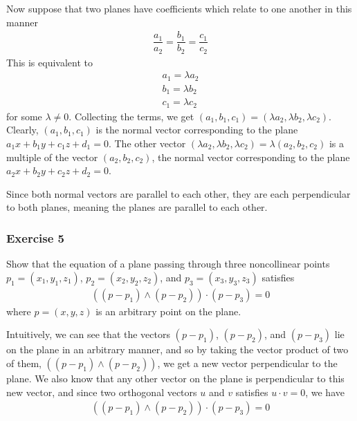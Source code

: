 \documentclass{article}
\begin{document}
	Now suppose that two planes have coefficients which relate to one another in this manner
	\begin{gather*}
		\dfrac{a_1}{a_2} = \dfrac{b_1}{b_2} = \dfrac{c_1}{c_2}
	\end{gather*}
	This is equivalent to 
	\begin{gather*}
		a_1 = \lambda a_2 \\
		b_1 = \lambda b_2 \\
		c_1 = \lambda c_2
	\end{gather*}
	for some $\lambda \neq 0$. Collecting the terms, we get $(a_1, b_1, c_1) = (\lambda a_2, \lambda b_2, \lambda c_2)$. Clearly, $(a_1, b_1, c_1)$ is the normal vector corresponding to the plane $a_1x + b_1y + c_1z + d_1 = 0$. The other vector $(\lambda a_2, \lambda b_2, \lambda c_2) = \lambda (a_2, b_2, c_2)$ is a multiple of the vector $(a_2, b_2, c_2)$, the normal vector corresponding to the plane $a_2x + b_2y + c_2z + d_2 = 0$.
	
	Since both normal vectors are parallel to each other, they are each perpendicular to both planes, meaning the planes are parallel to each other.
	
	\subsubsection*{Exercise 5}
	Show that the equation of a plane passing through three noncollinear points $p_1 = (x_1, y_1, z_1)$, $p_2 = (x_2, y_2, z_2)$, and $p_3 = (x_3, y_3, z_3)$ satisfies
	\begin{gather*}
		\left( (p - p_1) \wedge (p - p_2) \right) \cdot (p - p_3) = 0
	\end{gather*}
	where $p = (x, y, z)$ is an arbitrary point on the plane.
	
	Intuitively, we can see that the vectors $(p - p_1)$, $(p - p_2)$, and $(p - p_3)$ lie on the plane in an arbitrary manner, and so by taking the vector product of two of them, $\left( (p - p_1) \wedge (p - p_2) \right)$, we get a new vector perpendicular to the plane. We also know that any other vector on the plane is perpendicular to this new vector, and since two orthogonal vectors $u$ and $v$ satisfies $u \cdot v = 0$, we have
	\begin{gather*}
		\left( (p - p_1) \wedge (p - p_2) \right) \cdot (p - p_3) = 0
	\end{gather*}
	
\end{document}
